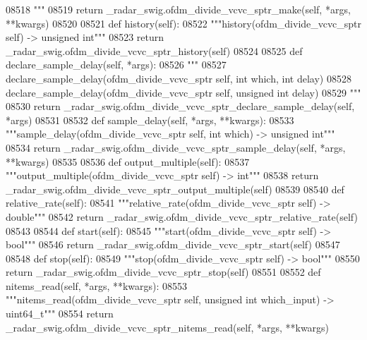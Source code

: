 \begin{DoxyCode}
{{{{{{{{{{{{{{{{{{{{{{{{{{{{08518 \textcolor{stringliteral}{        """}
08519         \textcolor{keywordflow}{return} \_radar\_swig.ofdm\_divide\_vcvc\_sptr\_make(self, *args, **kwargs)
08520 
08521     \textcolor{keyword}{def }history(self):
08522         \textcolor{stringliteral}{"""history(ofdm\_divide\_vcvc\_sptr self) -> unsigned int"""}
08523         \textcolor{keywordflow}{return} \_radar\_swig.ofdm\_divide\_vcvc\_sptr\_history(self)
08524 
08525     \textcolor{keyword}{def }declare_sample_delay(self, *args):
08526         \textcolor{stringliteral}{"""}
08527 \textcolor{stringliteral}{        declare\_sample\_delay(ofdm\_divide\_vcvc\_sptr self, int which, int delay)}
08528 \textcolor{stringliteral}{        declare\_sample\_delay(ofdm\_divide\_vcvc\_sptr self, unsigned int delay)}
08529 \textcolor{stringliteral}{        """}
08530         \textcolor{keywordflow}{return} \_radar\_swig.ofdm\_divide\_vcvc\_sptr\_declare\_sample\_delay(self, *args)
08531 
08532     \textcolor{keyword}{def }sample_delay(self, *args, **kwargs):
08533         \textcolor{stringliteral}{"""sample\_delay(ofdm\_divide\_vcvc\_sptr self, int which) -> unsigned int"""}
08534         \textcolor{keywordflow}{return} \_radar\_swig.ofdm\_divide\_vcvc\_sptr\_sample\_delay(self, *args, **kwargs)
08535 
08536     \textcolor{keyword}{def }output_multiple(self):
08537         \textcolor{stringliteral}{"""output\_multiple(ofdm\_divide\_vcvc\_sptr self) -> int"""}
08538         \textcolor{keywordflow}{return} \_radar\_swig.ofdm\_divide\_vcvc\_sptr\_output\_multiple(self)
08539 
08540     \textcolor{keyword}{def }relative_rate(self):
08541         \textcolor{stringliteral}{"""relative\_rate(ofdm\_divide\_vcvc\_sptr self) -> double"""}
08542         \textcolor{keywordflow}{return} \_radar\_swig.ofdm\_divide\_vcvc\_sptr\_relative\_rate(self)
08543 
08544     \textcolor{keyword}{def }start(self):
08545         \textcolor{stringliteral}{"""start(ofdm\_divide\_vcvc\_sptr self) -> bool"""}
08546         \textcolor{keywordflow}{return} \_radar\_swig.ofdm\_divide\_vcvc\_sptr\_start(self)
08547 
08548     \textcolor{keyword}{def }stop(self):
08549         \textcolor{stringliteral}{"""stop(ofdm\_divide\_vcvc\_sptr self) -> bool"""}
08550         \textcolor{keywordflow}{return} \_radar\_swig.ofdm\_divide\_vcvc\_sptr\_stop(self)
08551 
08552     \textcolor{keyword}{def }nitems_read(self, *args, **kwargs):
08553         \textcolor{stringliteral}{"""nitems\_read(ofdm\_divide\_vcvc\_sptr self, unsigned int which\_input) -> uint64\_t"""}
08554         \textcolor{keywordflow}{return} \_radar\_swig.ofdm\_divide\_vcvc\_sptr\_nitems\_read(self, *args, **kwargs)
}}}}}}}}}}}}}}}}}}}}}}}}}}}}
\end{DoxyCode}
